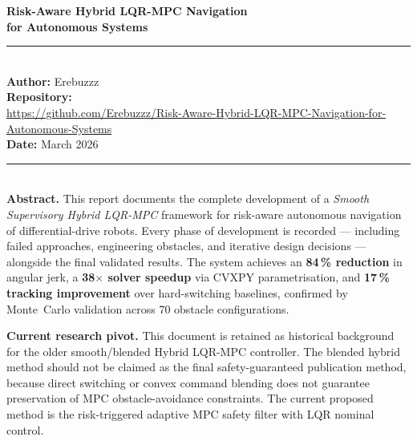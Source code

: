 \documentclass[12pt,a4paper,oneside]{report}
\begin{document}
\begin{titlepage}\centering\vspace*{2cm}
{\Huge\bfseries Risk-Aware Hybrid LQR-MPC Navigation\\[0.4em]for Autonomous Systems\par}
\vspace{0.5cm}{\Large\itshape Comprehensive Technical Design \& Experimental Validation Report\par}
\vspace{1.5cm}\rule{0.8\linewidth}{0.4pt}\\[0.5cm]
{\large\textbf{Author:} Erebuzzz}\\[0.3cm]
{\large\textbf{Repository:}}\\[0.1cm]
\small\url{https://github.com/Erebuzzz/Risk-Aware-Hybrid-LQR-MPC-Navigation-for-Autonomous-Systems}\\[0.8cm]
{\large\textbf{Date:} March 2026}\\[2cm]
\rule{0.8\linewidth}{0.4pt}\\[0.5cm]
\noindent\textbf{Abstract.}
This report documents the complete development of a \textit{Smooth Supervisory Hybrid LQR-MPC} framework for risk-aware autonomous navigation of differential-drive robots. Every phase of development is recorded --- including failed approaches, engineering obstacles, and iterative design decisions --- alongside the final validated results. The system achieves an \textbf{84\,\% reduction} in angular jerk, a \textbf{38$\times$ solver speedup} via CVXPY parametrisation, and \textbf{17\,\% tracking improvement} over hard-switching baselines, confirmed by Monte~Carlo validation across 70 obstacle configurations.

\begin{warnbox}
\textbf{Current research pivot.} This document is retained as historical
background for the older smooth/blended Hybrid LQR-MPC controller. The blended
hybrid method should not be claimed as the final safety-guaranteed publication
method, because direct switching or convex command blending does not guarantee
preservation of MPC obstacle-avoidance constraints. The current proposed method
is the risk-triggered adaptive MPC safety filter with LQR nominal control.
\end{warnbox}
\end{titlepage}

\tableofcontents
\listoftables
\clearpage

\end{document}
